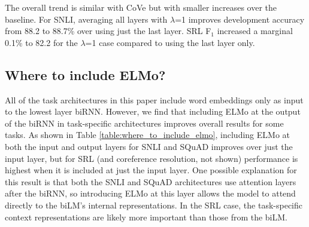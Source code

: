 \documentclass[11pt,a4paper]{article}
\newcommand{\ELMO}{ELMo}
\begin{document}
The overall trend is similar with CoVe but with smaller increases over the baseline.
For SNLI, averaging all layers with $\lambda$=1 improves development accuracy from 88.2 to 88.7\% over using just the last layer.
SRL F$_1$ increased a marginal 0.1\% to 82.2 for the $\lambda$=1 case compared to using the last layer only.



\subsection{Where to include \ELMO?}
\label{sec:where_to_include_elmo}
All of the task architectures in this paper include word embeddings only as input to the lowest layer biRNN.
However, we find that including \ELMO{} at the output of the biRNN in task-specific architectures improves overall results for some tasks.
As shown in Table \ref{table:where_to_include_elmo}, including \ELMO{} at both the input and output layers for SNLI and SQuAD improves over just the input layer, but for SRL (and coreference resolution, not shown) performance is highest when it is included at just the input layer.
One possible explanation for this result is that both the SNLI and SQuAD architectures use attention layers after the biRNN, so introducing \ELMO{} at this layer allows the model to attend directly to the biLM's internal representations.
In the SRL case, the task-specific context representations are likely more important than those from the biLM.
\end{document}
